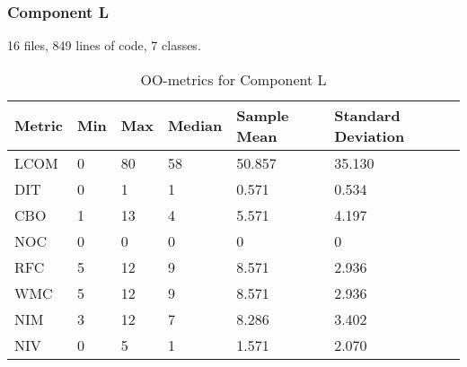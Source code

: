 \subsubsection{Component L}
16 files, 849 lines of code, 7 classes.
\begin{table}[]
\centering
\caption{OO-metrics for Component L}
\label{tab:oometrics-log}
\begin{tabular}{|l|l|l|l|l|l|}
\hline
\textbf{Metric} & \textbf{Min} & \textbf{Max} & \textbf{Median} & \textbf{Sample Mean} & \textbf{Standard Deviation} \\ \hline
LCOM            & 0            & 80           & 58              & 50.857               & 35.130                      \\ \hline
DIT             & 0            & 1            & 1               & 0.571                & 0.534                       \\ \hline
CBO             & 1            & 13           & 4               & 5.571                & 4.197                       \\ \hline
NOC             & 0            & 0            & 0               & 0                    & 0                           \\ \hline
RFC             & 5            & 12           & 9               & 8.571                & 2.936                       \\ \hline
WMC             & 5            & 12           & 9               & 8.571                & 2.936                       \\ \hline
NIM             & 3            & 12           & 7               & 8.286                & 3.402                       \\ \hline
NIV             & 0            & 5            & 1               & 1.571                & 2.070                       \\ \hline
\end{tabular}
\end{table}








